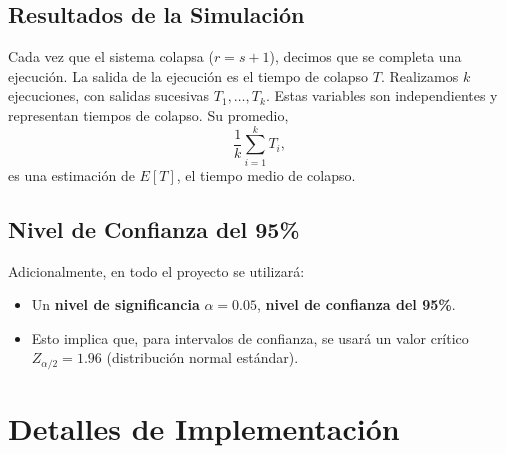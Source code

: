\documentclass[a4paper, 12pt]{article}
\begin{document}
\subsection*{Resultados de la Simulación}
Cada vez que el sistema colapsa ($ r = s + 1 $), decimos que se completa una ejecución. La salida de la ejecución es el tiempo de colapso $ T $. Realizamos $ k $ ejecuciones, con salidas sucesivas $ T_1, \dots, T_k $. Estas variables son independientes y representan tiempos de colapso. Su promedio,
\[
\frac{1}{k} \sum_{i=1}^k T_i,
\]
es una estimación de $ E[T] $, el tiempo medio de colapso. 

\subsection*{Nivel de Confianza del 95\%}
Adicionalmente, en todo el proyecto se utilizará:
\begin{itemize}
    \item Un \textbf{nivel de significancia} \(\alpha = 0.05\), \textbf{nivel de confianza del 95\%}.
    \item Esto implica que, para intervalos de confianza, se usará un valor crítico \(Z_{\alpha/2} = 1.96\) (distribución normal estándar).
\end{itemize}


\newpage
\section{Detalles de Implementación}
\end{document}
